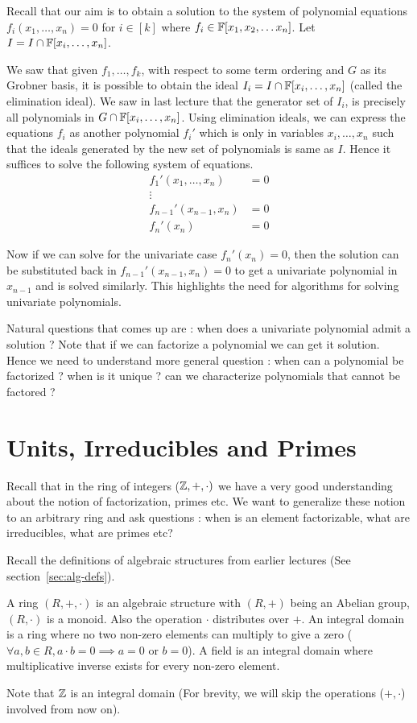 
Recall that our aim is to obtain a solution to the system of polynomial
equations $f_i(x_1,\ldots,x_n) = 0$ for $i \in [k]$ where $f_i \in {\mathbb{F}[x_1,x_2, \ldots x_n]}$.
Let $I = I \cap {\mathbb{F}}[x_i,\ldots, x_n]$.

We saw that given $f_1,\ldots,f_k$, with respect to some term ordering and $G$
as its Grobner basis,  it is possible to obtain the ideal $I_i = I \cap
{\mathbb{F}}[x_i,\ldots, x_n]$ (called the elimination ideal). We saw in last lecture
that the generator set of $I_i$, is precisely all polynomials in $G \cap
{\mathbb{F}}[x_i,\ldots, x_n]$. Using elimination ideals, we can express the equations
$f_i$ as another polynomial $f_i'$ which is only in variables $x_i,
\ldots,x_n$ such that the ideals generated by the new set of polynomials is
same as $I$. Hence it suffices to solve the following system of equations. 
\begin{align*}
	f_1'(x_1,\ldots,x_n) & = 0 \\
	\vdots \\
	f_{n-1}'(x_{n-1},x_n)  & = 0 \\
	f_n'(x_n) & = 0
\end{align*}

Now if we can solve for the univariate case $f_n'(x_n) = 0$, then the solution 
can be substituted back in $f_{n-1}'(x_{n-1},x_n) = 0$ to get a univariate 
polynomial in $x_{n-1}$ and is solved similarly. This highlights the
need for algorithms for solving univariate polynomials.

Natural questions that comes up are : when does a univariate polynomial admit
a solution ? Note that if we can factorize a polynomial we can get it
solution. Hence we need to understand more general question : when can a
polynomial be factorized ? when is it unique ? can we characterize
polynomials that cannot be factored ?

\section{Units, Irreducibles and Primes}
Recall that in the ring of integers (${\mathbb{Z}},+, \cdot)$ we have a very
good understanding about the notion of factorization, primes etc.
We want to generalize these notion to an arbitrary ring and ask
questions : when is an element factorizable, what are irreducibles,
what are primes etc?

Recall the definitions of algebraic structures from earlier lectures (See
section~\ref{sec:alg-defs}). 
\begin{definition}
	A ring $(R,+,\cdot)$ is an algebraic structure with $(R,+)$ being an
	Abelian group, $(R,\cdot)$ is a monoid. Also the operation $\cdot$
	distributes over $+$.  An integral domain is a ring where no two
	non-zero elements can multiply to give a zero ($\forall a, b \in R,
	a\cdot b = 0 \implies a =0 \text{ or } b = 0$).  A field is an
	integral domain where multiplicative inverse exists for every non-zero
	element.
\end{definition}
Note that ${\mathbb{Z}}$ is an integral domain (For brevity, we will skip the 
operations ($+, \cdot$) involved from now on).

